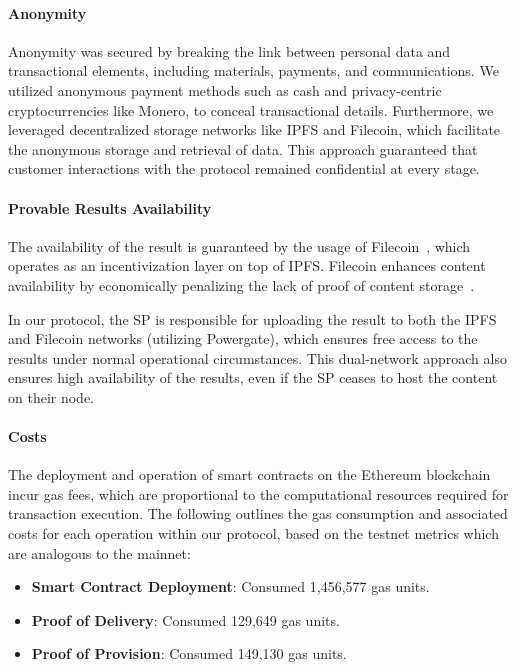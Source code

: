 \documentclass[pdftex,twocolumn,epjc3]{svjour3}
\begin{document}
\paragraph{Anonymity}
\begin{sloppypar}
Anonymity was secured by breaking the link between personal data and transactional elements, including materials, payments, and communications. We utilized anonymous payment methods such as cash and privacy-centric cryptocurrencies like Monero, to conceal transactional details. Furthermore, we leveraged decentralized storage networks like IPFS and Filecoin, which facilitate the anonymous storage and retrieval of data. This approach guaranteed that customer interactions with the protocol remained confidential at every stage.
\end{sloppypar}

\paragraph{Provable Results Availability}\label{sec:provable-results-availability}
The availability of the result is guaranteed by the usage of Filecoin~\cite{protocollabsFilecoinDecentralizedStorage2017}, which operates as an incentivization layer on top of IPFS. Filecoin enhances content availability by economically penalizing the lack of proof of content storage~\cite{filecoinSlashing}.

In our protocol, the SP is responsible for uploading the result to both the IPFS and Filecoin networks (utilizing Powergate), which ensures free access to the results under normal operational circumstances. This dual-network approach also ensures high availability of the results, even if the SP ceases to host the content on their node.

\paragraph{Costs}
The deployment and operation of smart contracts on the Ethereum blockchain incur gas fees, which are proportional to the computational resources required for transaction execution. The following outlines the gas consumption and associated costs for each operation within our protocol, based on the testnet metrics which are analogous to the mainnet:

\begin{itemize}
    \item \textbf{Smart Contract Deployment}: Consumed 1,456,577 gas units.
    \item \textbf{Proof of Delivery}: Consumed 129,649 gas units.
    \item \textbf{Proof of Provision}: Consumed 149,130 gas units.
\end{itemize}
\end{document}
